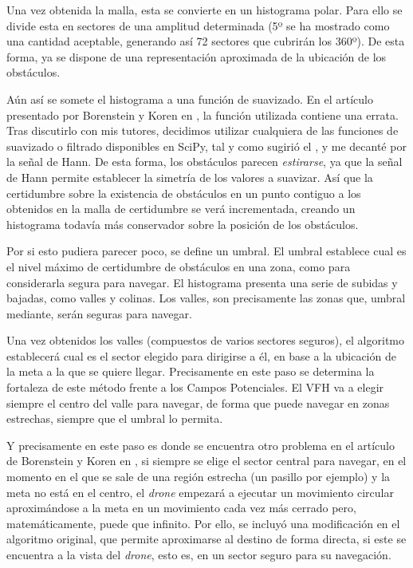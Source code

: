 Una vez obtenida la malla, esta se convierte en un histograma polar. Para ello se divide esta en sectores de una amplitud determinada (5º se ha mostrado como una cantidad aceptable, generando así 72 sectores que cubrirán los 360º). De esta forma, ya se dispone de una representación aproximada de la ubicación de los obstáculos. 

Aún así se somete el histograma a una función de suavizado. En el artículo presentado por Borenstein y Koren en \citep{art:BorensteinKorenVFH}, la función utilizada contiene una errata. Tras discutirlo con mis tutores, decidimos utilizar cualquiera de las funciones de suavizado o filtrado disponibles en SciPy, tal y como sugirió el \cotutorTwo{}, y me decanté por la señal de Hann. 
De esta forma, los obstáculos parecen \textit{estirarse}, ya que la señal de Hann permite establecer la simetría de los valores a suavizar. Así que la certidumbre sobre la existencia de obstáculos en un punto contiguo a los obtenidos en la malla de certidumbre se verá incrementada, creando un histograma todavía más conservador sobre la posición de los obstáculos. 

Por si esto pudiera parecer poco, se define un umbral. El umbral establece cual es el nivel máximo de certidumbre de obstáculos en una zona, como para considerarla segura para navegar. 
El histograma presenta una serie de subidas y bajadas, como valles y colinas. Los valles, son precisamente las zonas que, umbral mediante, serán seguras para navegar.

Una vez obtenidos los valles (compuestos de varios sectores seguros), el algoritmo establecerá cual es el sector elegido para dirigirse a él, en base a la ubicación de la meta a la que se quiere llegar. 
Precisamente en este paso se determina la fortaleza de este método frente a los Campos Potenciales. El VFH va a elegir siempre el centro del valle para navegar, de forma que puede navegar en zonas estrechas, siempre que el umbral lo permita. 

Y precisamente en este paso es donde se encuentra otro problema en el artículo de Borenstein y Koren en \citep{art:BorensteinKorenVFH}, si siempre se elige el sector central para navegar, en el momento en el que se sale de una región estrecha (un pasillo por ejemplo) y la meta no está en el centro, el \emph{drone} empezará a ejecutar un movimiento circular aproximándose a la meta en un movimiento cada vez más cerrado pero, matemáticamente, puede que infinito. Por ello, se incluyó una modificación en el algoritmo original, que permite aproximarse al destino de forma directa, si este se encuentra a la vista del \emph{drone}, esto es, en un sector seguro para su navegación.

